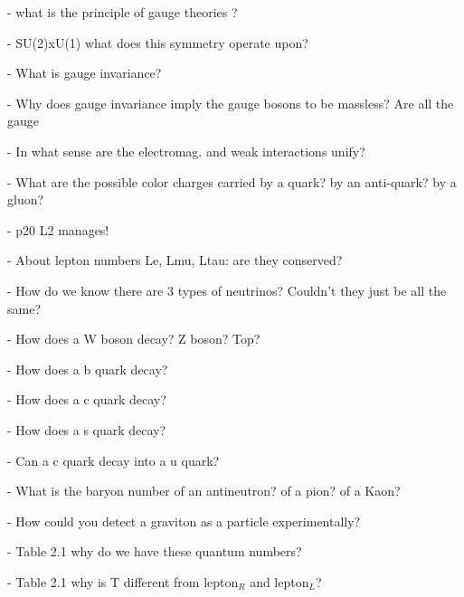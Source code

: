 \documentclass[a4paper,10pt,twoside,notitlepage]{article}
\begin{document}
\begin{description}
  - what is the principle of gauge theories ?

  - SU(2)xU(1) what does this symmetry operate upon?

  - What is gauge invariance?

  - Why does gauge invariance imply the gauge bosons to be massless? Are all the
  gauge

  - In what sense are the electromag. and weak interactions unify?

  - What are the possible color charges carried by a quark? by an anti-quark? by
  a gluon?

  - p20 L2 manages!

  - About lepton numbers Le, Lmu, Ltau: are they conserved?

  - How do we know there are 3 types of neutrinos? Couldn’t they just be all the
  same?

  - How does a W boson decay? Z boson? Top?

  - How does a b quark decay?

  - How does a c quark decay?

  - How does a s quark decay?

  - Can a c quark decay into a u quark?

  - What is the baryon number of an antineutron? of a pion? of a Kaon?

  - How could you detect a graviton as a particle experimentally?

  - Table 2.1 why do we have these quantum numbers?

  - Table 2.1 why is T different from lepton$_R$ and lepton$_L$?
\end{description}
\end{document}
